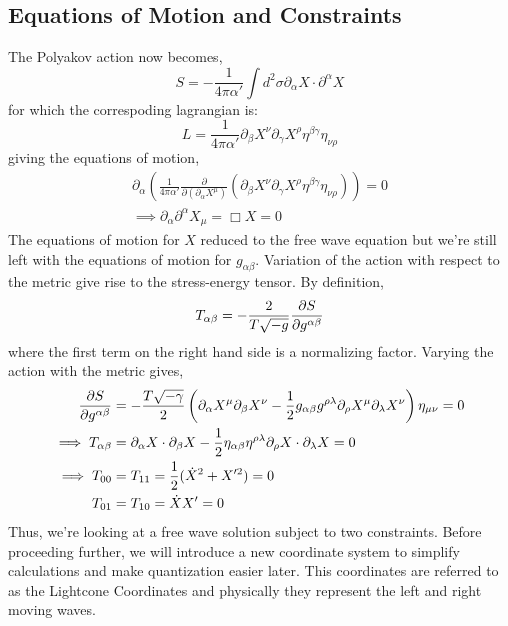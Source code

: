 \documentclass{article}
\providecommand{\brak}[1]{\ensuremath{\left(#1\right)}} %
\begin{document}
\subsection{Equations of Motion and Constraints}
The Polyakov action now becomes,
\begin{equation}
	S = -\frac{1}{4\pi\alpha'}\int d^2\sigma \partial_\alpha X\cdot\partial^\alpha X
\end{equation}
for which the correspoding lagrangian is:
\begin{equation}
	L  = \frac{1}{4\pi\alpha'} \partial_\beta X^\nu\partial_\gamma X^\rho\eta^{\beta\gamma}\eta_{\nu\rho}
\end{equation}
giving the equations of motion,
\begin{align}
	\partial_\alpha\brak{\frac{1}{4\pi\alpha'}\frac{\partial}{\partial(\partial_\alpha X^\mu)}\brak{\partial_\beta X^\nu\partial_\gamma X^\rho\eta^{\beta\gamma}\eta_{\nu\rho}}} = 0\\
	\implies \partial_\alpha\partial^\alpha X_\mu = \Box X=0 \label{eq:eom}
\end{align}
The equations of motion for $X$ reduced to the free wave equation but we're still left with the equations of motion for $g_{\alpha\beta}$. Variation of the action with respect to the metric give rise to the stress-energy tensor. By definition,
\begin{equation}
	T_{\alpha\beta}  =- \frac{2}{T\sqrt{-g}} \pdv{S}{g^{\alpha\beta}}
\end{equation}
where the first term on the right hand side is a normalizing factor. Varying the action with the metric gives,
\begin{align}
	\pdv{S}{g^{\alpha\beta}} &= -\frac{T\sqrt{-\gamma}}{2}\brak{\partial_\alpha X^\mu\partial_\beta X^\nu-\frac{1}{2}g_{\alpha\beta}g^{\rho\lambda}\partial_\rho X^\mu\partial_\lambda X^\nu}\eta_{\mu\nu}=0\\
	\implies T_{\alpha\beta} &= \partial_\alpha X\cdot\partial_\beta X -\frac{1}{2}\eta_{\alpha\beta}\eta^{\rho\lambda}\partial_\rho X\cdot\partial_\lambda X=0\\
	\implies T_{00} &= T_{11} = \frac{1}{2}(\dot{X}^2+X'^2) = 0\nonumber\\
	T_{01}&=T_{10} = \dot{X}X'=0
\end{align}
Thus, we're looking at a free wave solution subject to two constraints. Before proceeding further, we will introduce a new coordinate system to simplify calculations and make quantization easier later. This coordinates are referred to as the Lightcone Coordinates and physically they represent the left and right moving waves.
\end{document}
